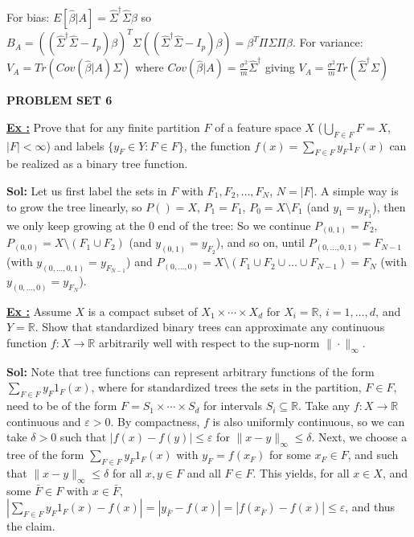 \documentclass[a4paper,10pt]{article}
\newcommand{\subtitle}[1]{\vspace{0.25cm}\begin{normalsize}\textbf{\textcolor{gray!150}{\uppercase{#1}}}\end{normalsize}}
\newcounter{exerciseCounter}
\newcommand{\exercise}[1]{%
    \vspace{1mm}
    \stepcounter{exerciseCounter}%
    \color{exerciseBlack}
    \textbf{\underline{Ex \theexerciseCounter:}} #1
}
\newcommand{\solution}[1]{%
    {\color{solutionGray} \textbf{Sol: } #1} %
}
\begin{document}
\begin{scriptsize}
{For bias: $E[\hat{\beta}|A] = \hat{\Sigma}^\dagger\hat{\Sigma}\beta$ so
$B_A = (({\hat{\Sigma}^\dagger\hat{\Sigma}-I_p})\beta)^T\Sigma(({\hat{\Sigma}^\dagger\hat{\Sigma}-I_p})\beta) = \beta^T\Pi\Sigma\Pi\beta$.
For variance: $V_A = Tr(Cov(\hat{\beta}|A)\Sigma)$ where
$Cov(\hat{\beta}|A) = \frac{\sigma^2}{m}\hat{\Sigma}^\dagger$
giving $V_A = \frac{\sigma^2}{m}Tr(\hat{\Sigma}^\dagger\Sigma)$}

\subtitle{Problem Set 6}

\exercise{Prove that for any finite partition $F$ of a feature space $X$ ($\bigcup_{F \in F} F = X$, $|F| < \infty$) and labels $\{y_F \in Y : F \in F\}$, the function $f(x) = \sum_{F \in F} y_F 1_F(x)$ can be realized as a binary tree function.}
\solution{Let us first label the sets in $F$ with $F_1, F_2, \ldots, F_N$, $N = |F|$. A simple way is to grow the tree linearly, so $P() = X$, $P_1 = F_1$, $P_0 = X \setminus F_1$ (and $y_1 = y_{F_1}$), then we only keep growing at the 0 end of the tree: So we continue $P_{(0,1)} = F_2$, $P_{(0,0)} = X \setminus (F_1 \cup F_2)$ (and $y_{(0,1)} = y_{F_2}$), and so on, until $P_{(0,\ldots,0,1)} = F_{N-1}$ (with $y_{(0,\ldots,0,1)} = y_{F_{N-1}}$) and $P_{(0,\ldots,0)} = X \setminus (F_1 \cup F_2 \cup \ldots \cup F_{N-1}) = F_N$ (with $y_{(0,\ldots,0)} = y_{F_N}$).}

\exercise{Assume $X$ is a compact subset of $X_1 \times \cdots \times X_d$ for $X_i = \mathbb{R}$, $i = 1,\ldots,d$, and $Y = \mathbb{R}$. Show that standardized binary trees can approximate any continuous function $f: X \to \mathbb{R}$ arbitrarily well with respect to the sup-norm $\|\cdot\|_\infty$.}
\solution{Note that tree functions can represent arbitrary functions of the form $\sum_{F \in F} y_F 1_F(x)$, where for standardized trees the sets in the partition, $F \in F$, need to be of the form $F = S_1 \times \cdots \times S_d$ for intervals $S_i \subseteq \mathbb{R}$. Take any $f: X \to \mathbb{R}$ continuous and $\varepsilon > 0$. By \color{solutionGray} compactness, $f$ is also uniformly continuous, so we can take $\delta > 0$ such that $|f(x) - f(y)| \leq \varepsilon$ for $\|x - y\|_\infty \leq \delta$. Next, we choose a tree of the form $\sum_{F \in F} y_F 1_F(x)$ with $y_F = f(x_F)$ for some $x_F \in F$, and such that $\|x - y\|_\infty \leq \delta$ for all $x,y \in F$ and all $F \in F$. This yields, for all $x \in X$, and some $\bar{F} \in F$ with $x \in \bar{F}$, $|\sum_{F \in F} y_F 1_F(x) - f(x)| = |y_{\bar{F}} - f(x)| = |f(x_{\bar{F}}) - f(x)| \leq \varepsilon$, and thus the claim.}


\end{scriptsize}
\end{document}
